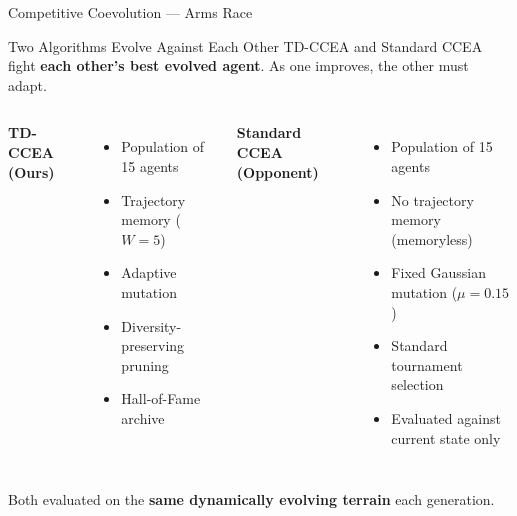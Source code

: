 \documentclass[aspectratio=169, 10pt]{beamer}
\begin{document}
\begin{frame}{Competitive Coevolution --- Arms Race}
\begin{block}{Two Algorithms Evolve Against Each Other}
TD-CCEA and Standard CCEA fight \textbf{each other's best evolved agent}. As one improves, the other must adapt.
\end{block}
\vspace{0.15cm}\small
\begin{columns}[t]
    \textbf{TD-CCEA (Ours)}
    \begin{itemize}
        \item Population of 15 agents
        \item Trajectory memory ($W=5$)
        \item Adaptive mutation
        \item Diversity-preserving pruning
        \item Hall-of-Fame archive
    \end{itemize}
    \textbf{Standard CCEA (Opponent)}
    \begin{itemize}
        \item Population of 15 agents
        \item No trajectory memory (memoryless)
        \item Fixed Gaussian mutation ($\mu=0.15$)
        \item Standard tournament selection
        \item Evaluated against current state only
    \end{itemize}
\end{columns}
\vspace{0.2cm}\centering
Both evaluated on the \textbf{same dynamically evolving terrain} each generation.
\end{frame}
\end{document}

